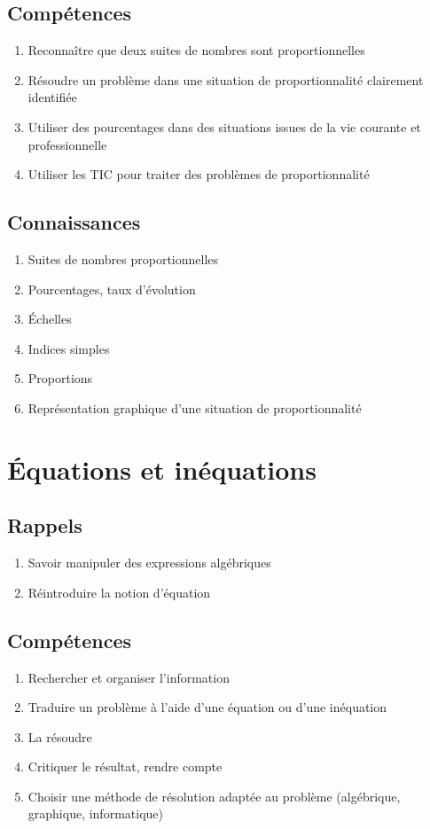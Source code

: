 \documentclass[12pt,a4paper]{article}
\begin{document}
\subsection*{Compétences}
\begin{enumerate}
	\item Reconnaître que deux suites de nombres sont proportionnelles
	\item Résoudre un problème dans une situation de proportionnalité clairement identifiée
	\item Utiliser des pourcentages dans des situations issues de la vie courante et professionnelle
	\item Utiliser les TIC pour traiter des problèmes de proportionnalité
\end{enumerate}

\subsection*{Connaissances}
\begin{enumerate}
	\item Suites de nombres proportionnelles
	\item Pourcentages, taux d'évolution
	\item \'Echelles
	\item Indices simples
	\item Proportions
	\item Représentation graphique d'une situation de proportionnalité
\end{enumerate}


\section{\'Equations et inéquations}
\subsection*{Rappels}
\begin{enumerate}
	\item Savoir manipuler des expressions algébriques
	\item Réintroduire la notion d'équation
\end{enumerate}

\subsection*{Compétences}
\begin{enumerate}
	\item Rechercher et organiser l'information
	\item Traduire un problème à l'aide d'une équation ou d'une inéquation
	\item La résoudre
	\item Critiquer le résultat, rendre compte
	\item Choisir une méthode de résolution adaptée au problème (algébrique, graphique, informatique)
\end{enumerate}
\end{document}
